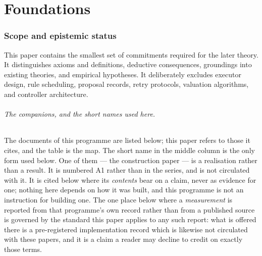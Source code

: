\documentclass[11pt,a4paper]{article}
\theoremstyle{remark}\newtheorem{remark}[definition]{Remark}
\begin{document}
\tableofcontents
\medskip

\part{Foundations}
\section{Scope and epistemic status}\label{sec:scope}
This paper contains the smallest set of commitments required for the later theory. It distinguishes axioms and definitions, deductive consequences, groundings into existing theories, and empirical hypotheses. It deliberately excludes executor design, rule scheduling, proposal records, retry protocols, valuation algorithms, and controller architecture.

\paragraph{The companions, and the short names used here.}
The documents of this programme are listed below; this paper refers to those it cites, and the table
is the map. The short name in the middle column is the only form used below. One of them --- the
construction paper --- is a realisation rather than a result. It is numbered A1 rather than in the
series, and is not circulated with it. It is cited below where its \emph{contents} bear on a claim,
never as evidence for one; nothing here depends on how it was built, and this programme is not an
instruction for building one. The one place below where a \emph{measurement}
is reported from that programme's own record rather than from a published source is governed by the
standard this paper applies to any such report: what is offered there
is a pre-registered implementation record which is likewise not circulated with these papers, and it is
a claim a reader may decline to credit on exactly those terms.
\end{document}
